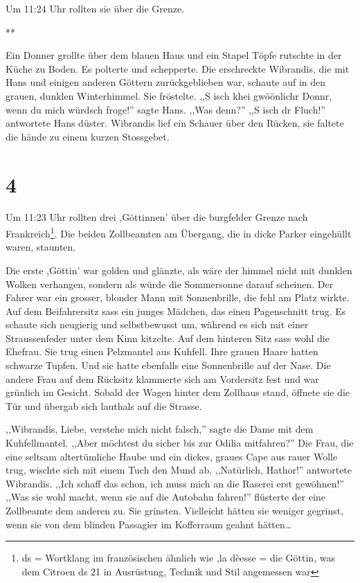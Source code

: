 \documentclass[11pt,titlepage,a5paper]{book}
\newcommand{\sterne}{\par{\centering ***\par}}
\begin{document}
Um 11:24 Uhr rollten sie über die Grenze.

\sterne

Ein Donner grollte über dem blauen Haus und ein Stapel Töpfe rutschte in der Küche zu Boden. Es polterte und schepperte. Die erschreckte Wibrandis, die mit Hans und einigen anderen Göttern zurückgeblieben war, schaute auf in den grauen, dunklen Winterhimmel. Sie fröstelte. ,,S isch khei gwöönlichr Donnr, wenn du mich würdsch froge!'' sagte Hans. ,,Was denn?'' ,,S isch dr Fluch!'' antwortete Hans düster. Wibrandis lief ein Schauer über den Rücken, sie faltete die hände zu einem kurzen Stossgebet.

\section*{4}

Um 11:23 Uhr rollten drei ,Göttinnen' über die burgfelder Grenze nach Frankreich\footnote{ds = Wortklang im französischen ähnlich wie ,la dèesse = die Göttin, was dem Citroen ds 21 in Ausrüstung, Technik und Stil angemessen war}. Die beiden Zollbeamten am Übergang, die in dicke Parker eingehüllt waren, staunten.

 Die erste ,Göttin' war golden und glänzte, als wäre der himmel nicht mit dunklen Wolken verhangen, sondern als würde die Sommersonne darauf scheinen. Der Fahrer war ein grosser, blonder Mann mit Sonnenbrille, die fehl am Platz wirkte. Auf dem Beifahrersitz sass ein junges Mädchen, das einen Pagenschnitt trug. Es schaute sich neugierig und selbstbewusst um, während es sich mit einer Straussenfeder unter dem Kinn kitzelte.  Auf dem hinteren Sitz sass wohl die Ehefrau. Sie trug einen Pelzmantel aus Kuhfell. Ihre grauen Haare hatten schwarze Tupfen. Und sie hatte ebenfalls eine Sonnenbrille auf der Nase. Die andere Frau auf dem Rücksitz klammerte sich am Vordersitz fest und war grünlich im Gesicht. Sobald der Wagen hinter dem Zollhaus stand, öffnete sie die Tür und übergab sich lauthals auf die Strasse. 
 
 ,,Wibrandis, Liebe, verstehe mich nicht falsch,'' sagte die Dame mit dem Kuhfellmantel. ,,Aber möchtest du sicher bis zur Odilia mitfahren?'' Die Frau, die eine seltsam altertümliche Haube und ein dickes, graues Cape aus rauer Wolle trug, wischte sich mit einem Tuch den Mund ab. ,,Natürlich, Hathor!'' antwortete Wibrandis. ,,Ich schaff das schon, ich muss mich an die Raserei erst gewöhnen!'' ,,Was sie wohl macht, wenn sie auf die Autobahn fahren!'' flüsterte der eine Zollbeamte dem anderen zu. Sie grinsten. Vielleicht hätten sie weniger gegrinst, wenn sie von dem blinden Passagier im Kofferraum geahnt hätten\dots
 
\end{document}
